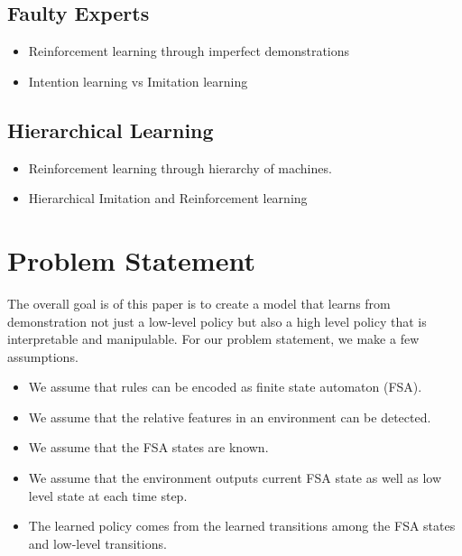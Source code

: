 \documentclass[letterpaper, 10 pt, conference]{ieeeconf}  %
\begin{document}
\subsection{Faulty Experts}

\begin{itemize}
  \item Reinforcement learning through imperfect demonstrations
  \item Intention learning vs Imitation learning
\end{itemize}

\subsection{Hierarchical Learning}

\begin{itemize}
  \item Reinforcement learning through hierarchy of machines.
  \item Hierarchical Imitation and Reinforcement learning
\end{itemize}

\section{Problem Statement}

The overall goal is of this paper is to create a model that learns from demonstration not just a low-level policy but also a high level policy that is interpretable and manipulable. For our problem statement, we make a few assumptions. 
\begin{itemize}
  \item We assume that rules can be encoded as finite state automaton (FSA). 
  \item We assume that the relative features in an environment can be detected.
  \item We assume that the FSA states are known.
  \item We assume that the environment outputs current FSA state as well as low level state at each time step.
  \item The learned policy comes from the learned transitions among the FSA states and low-level transitions.
\end{itemize}
\end{document}
